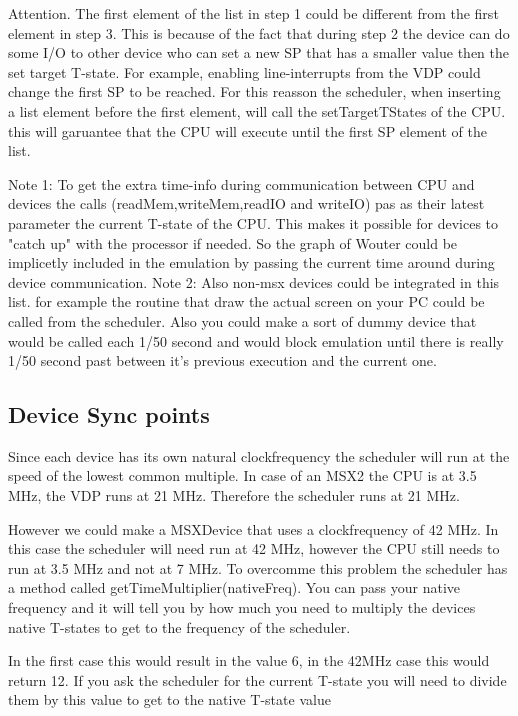 \documentclass[11pt, a4paper]{report}
\begin{document}
Attention. The first element of the list in step 1 could be different from
the first element in step 3. This is because of the fact that during step
2 the device can do some I/O to other device who can set a new SP that has
a smaller value then the set target T-state. For example, enabling
line-interrupts from the VDP could change the first SP to be reached.  For
this reasson the scheduler, when inserting a list element before the first
element, will call the setTargetTStates of the CPU. this will garuantee
that the CPU will execute until the first SP element of the list.

Note 1: To get the extra time-info during communication between CPU and
devices the calls (readMem,writeMem,readIO and writeIO) pas as their
latest parameter the current T-state of the CPU. This makes it possible
for devices to "catch up" with the processor if needed. So the graph of
Wouter could be implicetly included in the emulation by passing
the current time around during device communication.
Note 2: Also non-msx devices could be integrated in this list. for example
the routine that draw the actual screen on your PC could be called from
the scheduler. Also you could make a sort of dummy device that would be
called each 1/50 second and would block emulation until there is really
1/50 second past between it's previous execution and the current one.

\subsection{Device Sync points}

Since each device has its own natural clockfrequency the scheduler will
run at the speed of the lowest common multiple. In case of an MSX2 the CPU
is at 3.5 MHz, the VDP runs at 21 MHz. Therefore the scheduler runs at 21
MHz.

However we could make a MSXDevice that uses a clockfrequency of 42 MHz. In
this case the scheduler will need run at 42 MHz, however the CPU still
needs to run at 3.5 MHz and not at 7 MHz. To overcomme this problem the
scheduler has a method called getTimeMultiplier(nativeFreq). You can pass
your native frequency and it will tell you by how much you need to
multiply the devices native T-states to get to the frequency of the
scheduler. 

In the first case this would result in the value 6, in the 42MHz case this
would return 12. If you ask the scheduler for the current T-state you will
need to divide them by this value to get to the native T-state value 
\end{document}
